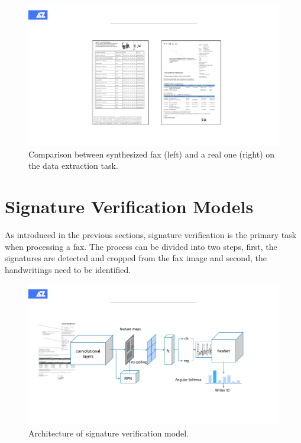 \documentclass[sigconf]{acmart}
\begin{document}
\begin{figure}[h]
	\centering
	\includegraphics[width=\linewidth]{figure4}
	\caption{Comparison between synthesized fax (left) and a real one (right) on the data extraction task. }
	\label{figure4}
\end{figure}



\section{Signature Verification Models}

As introduced in the previous sections, signature verification is the primary task when processing a fax. The process can be divided into two steps, first, the signatures are detected and cropped from the fax image and second, the handwritings need to be identified.

\begin{figure}[h]
	\centering
	\includegraphics[width=\linewidth]{figure2}
	\caption{Architecture of signature verification model. }
	\label{figure2}
\end{figure}
\end{document}
